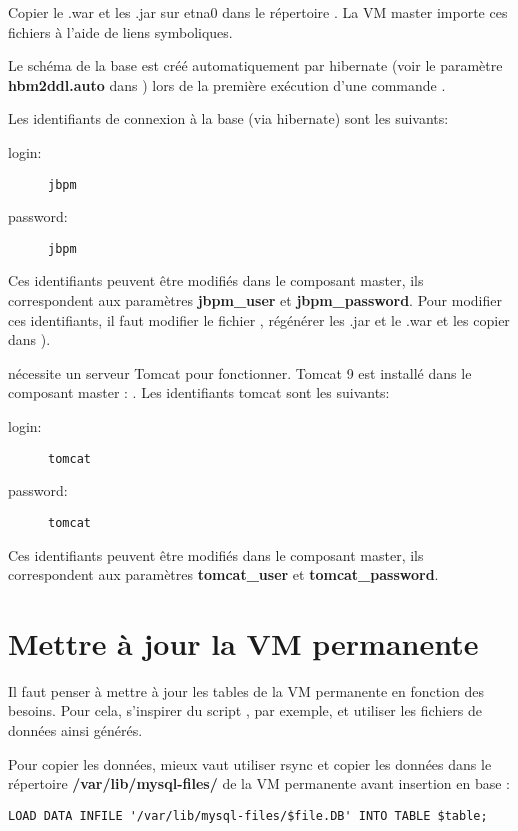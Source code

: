Copier le .war et les .jar sur etna0 dans le répertoire .
La VM master importe ces fichiers à l'aide de liens symboliques.

Le schéma de la base  est créé automatiquement par hibernate (voir le paramètre \textbf{hbm2ddl.auto} dans ) lors de la première exécution d'une commande .

Les identifiants de connexion à la base  (via hibernate) sont les suivants:
\begin{description}
    \item[login:] \texttt{jbpm}
    \item[password:] \texttt{jbpm}
\end{description}
Ces identifiants peuvent être modifiés dans le composant master, ils correspondent aux paramètres \textbf{jbpm\_user} et \textbf{jbpm\_password}.
Pour modifier ces identifiants, il faut modifier le fichier , régénérer les .jar et le .war et les copier dans ).

 nécessite un serveur Tomcat pour fonctionner.
Tomcat 9 est installé dans le composant master : .
Les identifiants tomcat sont les suivants:
\begin{description}
    \item[login:] \texttt{tomcat}
    \item[password:] \texttt{tomcat}
\end{description}
Ces identifiants peuvent être modifiés dans le composant master, ils correspondent aux paramètres \textbf{tomcat\_user} et \textbf{tomcat\_password}.

\section{Mettre à jour la VM permanente}

Il faut penser à mettre à jour les tables de la VM permanente en fonction des besoins. Pour cela, s'inspirer du script , par exemple, et utiliser les fichiers de données ainsi générés.

Pour copier les données, mieux vaut utiliser rsync et copier les données dans le répertoire \textbf{/var/lib/mysql-files/} de la VM permanente avant insertion en base :
\begin{lstlisting}[style=SQL]
LOAD DATA INFILE '/var/lib/mysql-files/$file.DB' INTO TABLE $table;
\end{lstlisting}
